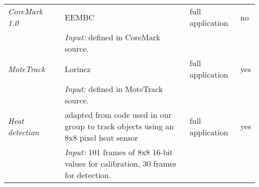 \begin{table}
\begin{tabular}{llp{}ll}
    \emph{CoreMark 1.0}      &                                          & EEMBC \cite{coremark}                                                                                      & full application & no \\
                             &                                          & \emph{Input:} defined in CoreMark source.                                                                  &                  & \\

    \emph{MoteTrack}         &                                          & Lorincz \cite{Lorincz:2006fc, motetrack}                                                                   & full application & yes \\
                             &                                          & \emph{Input:} defined in MoteTrack source.                                                                 &                  & \\

    \emph{Heat detection}    &                                          & adapted from code used in our group to track objects using an 8x8 pixel heat sensor                        & full application & yes \\
                             &                                          & \emph{Input:} 101 frames of 8x8 16-bit values for calibration, 30 frames for detection.                    &                  & \\

    \bottomrule
    \end{tabular}  
\end{table}


